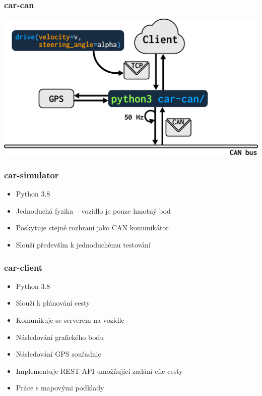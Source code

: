\documentclass{beamer}
\begin{document}
\begin{frame}
    \frametitle{car-can}
    \begin{center}
        \includegraphics[width=0.9\columnwidth]{car-can}
    \end{center}
\end{frame}


\begin{frame}
    \frametitle{car-simulator}
    \begin{itemize}
        \item Python 3.8
        \item Jednoduchá fyzika -- vozidlo je pouze hmotný bod
        \item Poskytuje stejné rozhraní jako CAN komunikátor
        \item Slouží především k jednoduchému testování
    \end{itemize}
\end{frame}

\begin{frame}
    \frametitle{car-client}
    \begin{itemize}
        \item Python 3.8
        \item Slouží k plánování cesty
        \item Komunikuje se serverem na vozidle
        \item Následování grafického bodu
        \item Následování GPS souřadnic
        \item Implementuje REST API umožňující zadání cíle cesty
        \item Práce s mapovými podklady
    \end{itemize}
\end{frame}
\end{document}

